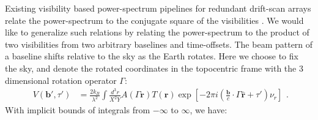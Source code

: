 \documentclass[twocolumn,apj,numberedappendix]{emulateapj}
\renewcommand\[{\begin{equation}}
\renewcommand\]{\end{equation}}
\begin{document}
Existing visibility based power-spectrum pipelines for redundant drift-scan  arrays relate the power-spectrum to the conjugate square of the visibilities \citep{delay-transform, paper32, Ali2015}. We would like to generalize such relations by relating the power-spectrum to the product of two visibilities from two arbitrary baselines and time-offsets. 
The beam pattern of a baseline shifts relative to the sky as the Earth rotates. Here we choose to fix the sky, and denote the rotated coordinates
in the topocentric frame with the 3 dimensional rotation operator $\Gamma$:
\small
\[
\begin{aligned}V(\boldsymbol{b'},\tau') & =\frac{2k_{B}}{\lambda^{2}}\int\frac{d^{3}r}{X^{2}Y}A(\Gamma\boldsymbol{r})T(\boldsymbol{r})\exp\left[-2\pi i\left(\frac{\boldsymbol{b}}{c}\cdot\Gamma\hat{\boldsymbol{r}}+\tau'\right)\nu_{r}\right]\end{aligned}.
\]
\normalsize
With implicit bounds of integrals from $-\infty$ to $\infty$, we have:
\end{document}
